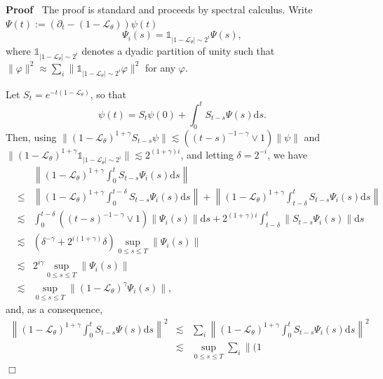 \documentclass{article}
\newcommand{\assign}{:=}
\newcommand{\mathd}{\mathrm{d}}
\newenvironment{proof}{\noindent\textbf{Proof\ }}{\hspace*{\fill}$\Box$\medskip}
\begin{document}
\begin{proof}
  The proof is standard and proceeds by spectral calculus. Write $\Psi (t)
  \assign (\partial_t - (1 -\mathcal{L}_{\theta})) \psi (t)$
  \[ \Psi_i (s) =\mathbb{1}_{| 1 -\mathcal{L}_{\theta} | \sim 2^i} \Psi (s),
  \]
  where $\mathbb{1}_{| 1 -\mathcal{L}_{\theta} | \sim 2^i}$ denotes a dyadic
  partition of unity such that $\| \varphi \|^2 \approx \sum_i \|
  \mathbb{1}_{| 1 -\mathcal{L}_{\theta} | \sim 2^i} \varphi \|^2$ for any
  $\varphi$.
  
  Let $S_t = e^{- t (1 -\mathcal{L}_{\theta})}$, so that
  \[ \psi (t) = S_t \psi (0) + \int_0^t S_{t - s} \Psi (s) \mathd s. \]
  Then, using $\| (1 -\mathcal{L}_{\theta})^{1 + \gamma} S_{t - s} \psi \|
  \lesssim ((t - s)^{- 1 - \gamma} \vee 1) \| \psi \|$ and $\| (1
  -\mathcal{L}_{\theta})^{1 + \gamma} \mathbb{1}_{| 1 -\mathcal{L}_{\theta} |
  \sim 2^i} \| \lesssim 2^{(1 + \gamma) i}$, and letting $\delta = 2^{- i}$,
  we have
  \[ \begin{array}{lll}
       &  & \left\| (1 -\mathcal{L}_{\theta})^{1 + \gamma} \int_0^t S_{t - s}
       \Psi_i (s) \mathd s \right\|\\
       & \leqslant & \left\| (1 -\mathcal{L}_{\theta})^{1 + \gamma} \int_0^{t
       - \delta} S_{t - s} \Psi_i (s) \mathd s \right\| + \left\| (1
       -\mathcal{L}_{\theta})^{1 + \gamma} \int_{t - \delta}^t S_{t - s}
       \Psi_i (s) \mathd s \right\|\\
       & \lesssim & \int_0^{t - \delta} ((t - s)^{- 1 - \gamma} \vee 1) \|
       \Psi_i (s) \| \mathd s + 2^{(1 + \gamma) i} \int_{t - \delta}^t \| S_{t
       - s} \Psi_i (s) \| \mathd s\\
       & \lesssim & (\delta^{- \gamma} + 2^{i (1 + \gamma)} \delta) \sup_{0
       \leqslant s \leqslant T} \| \Psi_i (s) \|\\
       & \lesssim & 2^{i \gamma} \sup_{0 \leqslant s \leqslant T} \| \Psi_i
       (s) \|\\
       & \lesssim & \sup_{0 \leqslant s \leqslant T} \| (1
       -\mathcal{L}_{\theta})^{\gamma} \Psi_i (s) \|,
     \end{array} \]
  and, as a consequence,
  \[ \begin{array}{lll}
       \left\| (1 -\mathcal{L}_{\theta})^{1 + \gamma} \int_0^t S_{t - s} \Psi
       (s) \mathd s \right\|^2 & \lesssim & \sum_i \left\| (1
       -\mathcal{L}_{\theta})^{1 + \gamma} \int_0^t S_{t - s} \Psi_i (s)
       \mathd s \right\|^2\\
       & \lesssim & \sup_{0 \leqslant s \leqslant T} \sum_i \| (1

\end{array}\]
\end{proof}
\end{document}

